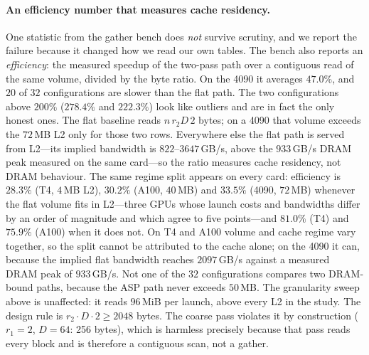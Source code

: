 \documentclass[sigconf,nonacm,11pt]{acmart}
\begin{document}
\paragraph{An efficiency number that measures cache residency.} One statistic
from the gather bench does \emph{not} survive scrutiny, and we report the failure
because it changed how we read our own tables. The bench also reports an
\emph{efficiency}: the measured speedup of the two-pass path over a contiguous
read of the same volume, divided by the byte ratio. On the 4090 it averages
$47.0\%$, and $20$ of $32$ configurations are slower than the flat path. The two
configurations above $200\%$ ($278.4\%$ and $222.3\%$) look like outliers and are
in fact the only honest ones. The flat baseline reads $n\,r_2D\,2$ bytes; on a
4090 that volume exceeds the $72$\,MB L2 only for those two rows. Everywhere else
the flat path is served from L2---its implied bandwidth is $822$--$3647$\,GB/s,
above the $933$\,GB/s DRAM peak measured on the same card---so the ratio measures
cache residency, not DRAM behaviour. The same regime split appears on
every card: efficiency is $28.3\%$ (T4, $4$\,MB L2), $30.2\%$ (A100, $40$\,MB)
and $33.5\%$ (4090, $72$\,MB) whenever the flat volume fits in L2---three GPUs
whose launch costs and bandwidths differ by an order of magnitude and which agree
to five points---and $81.0\%$ (T4) and $75.9\%$ (A100) when it does not. On T4 and
A100 volume and cache regime vary together, so the split cannot be attributed to
the cache alone; on the 4090 it can, because the implied flat bandwidth reaches
$2097$\,GB/s against a measured DRAM peak of $933$\,GB/s. Not one of the $32$ configurations compares two DRAM-bound paths, because
the ASP path never exceeds $50$\,MB. The granularity sweep above is unaffected: it
reads $96$\,MiB per launch, above every L2 in the study. The design rule is
$r_2\!\cdot\! D\!\cdot\!2\ge2048$ bytes. The coarse pass violates it by
construction ($r_1=2$, $D=64$: 256 bytes), which is harmless precisely because
that pass reads every block and is therefore a contiguous scan, not a gather.
\end{document}
